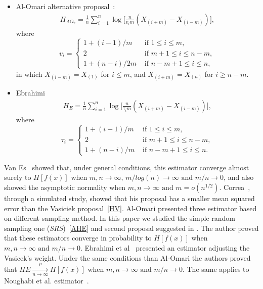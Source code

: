 \documentclass[journal]{IEEEtran}
\begin{document}
\begin{itemize}
		\item Al-Omari alternative proposal~\cite{AlOmari2016}:
		\label{AO2}
		\begin{align}
			H_{{AO}_2}=\frac{1}{n} \sum_{i=1}^{n} \log \Big[\frac{n}{v_{i} m}\left(X_{(i+m)}-X_{(i-m)}\right)\Big],
		\end{align}
		where
		\begin{equation*}
			v_{i}=\begin{cases}
				1+(i-1)/m & \text{ if }1 \leq i \leq m, \\
				2 & \text{ if } m+1 \leq i \leq n-m, \\
				1+(n-i)/2m & \text{ if } n-m+1 \leq i \leq n,
			\end{cases}
		\end{equation*}
		in which $X_{(i-m)}=X_{(1)}$ for $i \leq m$, and $X_{(i+m)}=X_{(n)}$ for $i \geq n-m$.
		\item Ebrahimi~\cite{Ebrahimi94}
		\begin{align}
			H_{E}=\frac{1}{n} \sum_{i=1}^{n} \log \Big[\frac{n}{\tau_{i} m}\left(X_{(i+m)}-X_{(i-m)}\right)\Big],
			\label{HE}
		\end{align}
		where
		\begin{equation*}
			\tau_{i}=\begin{cases}
				1+(i-1)/m & \text{ if }1 \leq i \leq m, \\
				2 & \text{ if } m+1 \leq i \leq n-m, \\
				1+(n-i)/m & \text{ if } n-m+1 \leq i \leq n.
			\end{cases}
		\end{equation*}
	\end{itemize}

Van Es~\cite{VanEs92} showed that, under general conditions, this estimator converge almost surely to $H[f(x)]$ when $m, n \to \infty \text{, } m/log(n) \to \infty \text{ and } m/n \to 0$, and also showed the asymptotic normality when $m, n \to \infty \text{ and }m = o(n^{1/2})$. Correa~\cite{Correa95}, through a simulated study, showed that his proposal has a smaller mean squared error than the Vasiciek proposal~\eqref{HV}. Al-Omari\cite{AlOmari2014} presented three estimator based on different sampling method. In this paper we studied the simple random sampling one (\textit{SRS})~\eqref{AHE} and second proposal suggested
in \cite{AlOmari2016}. The author proved that these estimators converge in probability to $ H[f(x)]$ when $m, n \to \infty  \text{ and } m/n \to 0$. Ebrahimi et al~\cite{Ebrahimi94} presented an estimator adjusting the Vasicek's\cite{Vasicek76} weight. Under the same conditions than Al-Omari\cite{AlOmari2014} the authors proved that $HE\underset{n \to \infty}{\overset{p}{\longrightarrow}} H[f(x)]$ when $m, n \to \infty  \text{ and } m/n \to 0$. The same applies to Noughabi et al. estimator~\cite{Noughabi2010}.
\end{document}

